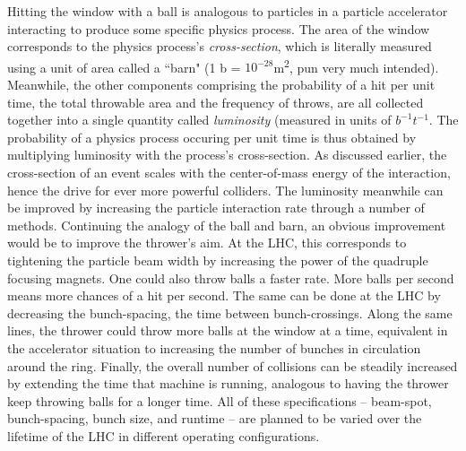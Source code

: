     Hitting the window with a ball is analogous to particles in a particle accelerator interacting to produce some specific physics process.
    The area of the window corresponds to the physics process's \textit{cross-section}, which is literally measured using a unit of area called a ``barn" (1 b = $10^{-28}$m\textsuperscript{2}, pun very much intended).
    Meanwhile, the other components comprising the probability of a hit per unit time, the total throwable area and the frequency of throws, are all collected together into a single quantity called \textit{luminosity} (measured in units of $b^{-1}t^{-1}$. 
    The probability of a physics process occuring per unit time is thus obtained by multiplying luminosity with the process's cross-section.
    As discussed earlier, the cross-section of an event scales with the center-of-mass energy of the interaction, hence the drive for ever more powerful colliders.
    The luminosity meanwhile can be improved by increasing the particle interaction rate through a number of methods.
    Continuing the analogy of the ball and barn, an obvious improvement would be to improve the thrower's aim.
    At the LHC, this corresponds to tightening the particle beam width by increasing the power of the quadruple focusing magnets.
    One could also throw balls a faster rate.
    More balls per second means more chances of a hit per second.
    The same can be done at the LHC by decreasing the bunch-spacing, the time between bunch-crossings.
    Along the same lines, the thrower could throw more balls at the window at a time, equivalent in the accelerator situation to increasing the number of bunches in circulation around the ring.
    Finally, the overall number of collisions can be steadily increased by extending the time that machine is running, analogous to having the thrower keep throwing balls for a longer time.
    All of these specifications -- beam-spot, bunch-spacing, bunch size, and runtime -- are planned to be varied over the lifetime of the LHC in different operating configurations.

    

